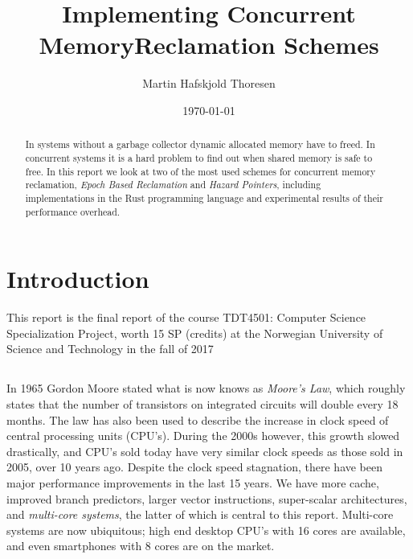 \documentclass[b5paper]{report}
\begin{document}
\title{Implementing Concurrent Memory\linebreak Reclamation Schemes}
\author{Martin Hafskjold Thoresen}
\date{\today}
\maketitle



\begin{abstract}
  In systems without a garbage collector dynamic allocated memory have to freed.
  In concurrent systems it is a hard problem to find out when shared memory is
  safe to free. In this report we look at two of the most used schemes for
  concurrent memory reclamation, \emph{Epoch Based Reclamation} and \emph{Hazard
  Pointers}, including implementations in the Rust programming language and
  experimental results of their performance overhead.
\end{abstract}

\tableofcontents

\chapter{Introduction}

This report is the final report of the course TDT4501: Computer Science
Specialization Project, worth 15 SP (credits) at the Norwegian University of
Science and Technology in the fall of 2017

\section*{}

In 1965 Gordon Moore stated what is now knows as \emph{Moore's Law}, which
roughly states that the number of transistors on integrated circuits will double
every 18 months. The law has also been used to describe the increase in clock
speed of central processing units (CPU's). During the 2000s however, this growth
slowed drastically, and CPU's sold today have very similar clock speeds as those
sold in 2005, over 10 years ago. Despite the clock speed stagnation, there have
been major performance improvements in the last 15 years. We have more cache,
improved branch predictors, larger vector instructions, super-scalar
architectures, and \emph{multi-core systems}, the latter of which is central to
this report. Multi-core systems are now ubiquitous; high end desktop CPU's with
16 cores are available, and even smartphones with 8 cores are on the market.
\end{document}
